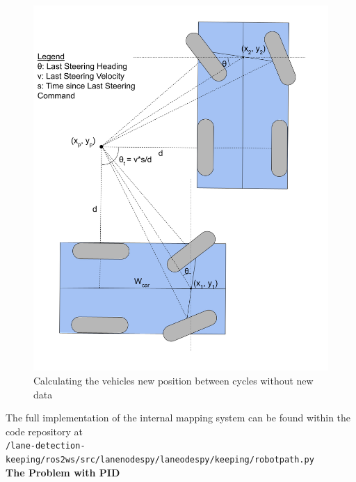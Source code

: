 \documentclass[titlepage, draft]{article}
\begin{document}
{\begin{figure}
	\centering
	\includegraphics[width=5in]{update_description}
	\caption{Calculating the vehicles new position between cycles without new data}
	\label{fig:internal_update_determination}
\end{figure}

The full implementation of the internal mapping system can be found within the code repository at \\
\texttt{/lane-detection-keeping/ros2\textunderscore ws/src/lane\textunderscore nodes\textunderscore py/lane\textunderscore odes\textunderscore py/keeping/robot\textunderscore path.py}
\\

\textbf{The Problem with PID}

}
\end{document}
